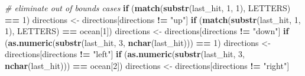 \documentclass[
]{article}
\newenvironment{Shaded}{\begin{snugshade}}{\end{snugshade}}
\newcommand{\CommentTok}[1]{\textcolor[rgb]{0.56,0.35,0.01}{\textit{#1}}}
\newcommand{\ControlFlowTok}[1]{\textcolor[rgb]{0.13,0.29,0.53}{\textbf{#1}}}
\newcommand{\DecValTok}[1]{\textcolor[rgb]{0.00,0.00,0.81}{#1}}
\newcommand{\FunctionTok}[1]{\textcolor[rgb]{0.13,0.29,0.53}{\textbf{#1}}}
\newcommand{\NormalTok}[1]{#1}
\newcommand{\OtherTok}[1]{\textcolor[rgb]{0.56,0.35,0.01}{#1}}
\newcommand{\SpecialCharTok}[1]{\textcolor[rgb]{0.81,0.36,0.00}{\textbf{#1}}}
\newcommand{\StringTok}[1]{\textcolor[rgb]{0.31,0.60,0.02}{#1}}
\begin{document}
\begin{Shaded}
\begin{Highlighting}[]
      \CommentTok{\# eliminate out of bounds cases}
      \ControlFlowTok{if}\NormalTok{ (}\FunctionTok{match}\NormalTok{(}\FunctionTok{substr}\NormalTok{(last\_hit, }\DecValTok{1}\NormalTok{, }\DecValTok{1}\NormalTok{), LETTERS) }\SpecialCharTok{==} \DecValTok{1}\NormalTok{)}
\NormalTok{        directions }\OtherTok{\textless{}{-}}\NormalTok{ directions[directions }\SpecialCharTok{!=} \StringTok{"up"}\NormalTok{]}
      \ControlFlowTok{if}\NormalTok{ (}\FunctionTok{match}\NormalTok{(}\FunctionTok{substr}\NormalTok{(last\_hit, }\DecValTok{1}\NormalTok{, }\DecValTok{1}\NormalTok{), LETTERS) }\SpecialCharTok{==}\NormalTok{ ocean[}\DecValTok{1}\NormalTok{])}
\NormalTok{        directions }\OtherTok{\textless{}{-}}\NormalTok{ directions[directions }\SpecialCharTok{!=} \StringTok{"down"}\NormalTok{]}
      \ControlFlowTok{if}\NormalTok{ (}\FunctionTok{as.numeric}\NormalTok{(}\FunctionTok{substr}\NormalTok{(last\_hit, }\DecValTok{3}\NormalTok{, }\FunctionTok{nchar}\NormalTok{(last\_hit))) }\SpecialCharTok{==} \DecValTok{1}\NormalTok{)}
\NormalTok{        directions }\OtherTok{\textless{}{-}}\NormalTok{ directions[directions }\SpecialCharTok{!=} \StringTok{"left"}\NormalTok{]}
      \ControlFlowTok{if}\NormalTok{ (}\FunctionTok{as.numeric}\NormalTok{(}\FunctionTok{substr}\NormalTok{(last\_hit, }\DecValTok{3}\NormalTok{, }\FunctionTok{nchar}\NormalTok{(last\_hit))) }\SpecialCharTok{==}\NormalTok{ ocean[}\DecValTok{2}\NormalTok{])}
\NormalTok{        directions }\OtherTok{\textless{}{-}}\NormalTok{ directions[directions }\SpecialCharTok{!=} \StringTok{"right"}\NormalTok{]}
      

\end{Highlighting}
\end{Shaded}
\end{document}
